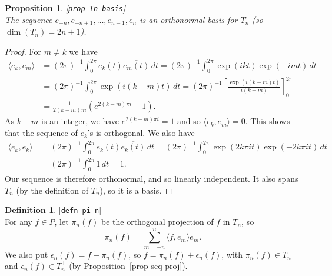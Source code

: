 \documentclass{amsart}
\newcommand{\lbl}[1]{\label{#1}\textup{[\texttt{#1}]}\ \\}
\newcommand{\lbl}{\label}
\newcommand{\ep}        {\epsilon}
\newcommand{\ip}[1]     {\langle #1\rangle}
\newcommand{\ov}[1]     {\overline{#1}}
\renewcommand{\:}       {\colon}
\newtheorem{proposition}[theorem]{Proposition}
\theoremstyle{definition}
\newtheorem{definition}[theorem]{Definition}
\begin{document}
\begin{proposition}\lbl{prop-Tn-basis}
 The sequence $e_{-n},e_{-n+1},\dotsc,e_{n-1},e_n$ is an
 orthonormal basis for $T_n$ (so $\dim(T_n)=2n+1$).
\end{proposition}
\begin{proof}
 For $m\neq k$ we have
 \begin{align*}
  \ip{e_k,e_m}
   &= (2\pi)^{-1} \int_0^{2\pi} e_k(t) \ov{e_m(t)} \, dt 
    = (2\pi)^{-1} \int_0^{2\pi} \exp(ikt) \exp(-imt) \, dt \\
   &= (2\pi)^{-1} \int_0^{2\pi} \exp(i(k-m)t) \, dt 
    = (2\pi)^{-1} \left[\frac{\exp(i(k-m)t)}{i(k-m)}\right]_0^{2\pi} \\
   &= \frac{1}{2(k-m)\pi i}\left( e^{2(k-m)\pi i} - 1 \right).
 \end{align*}
 As $k-m$ is an integer, we have $e^{2(k-m)\pi i}=1$ and
 so $\ip{e_k,e_m}=0$.  This shows that the sequence of
 $e_k$'s is orthogonal.  We also have 
 \begin{align*}
  \ip{e_k,e_k} 
   &= (2\pi)^{-1}\int_0^{2\pi} e_k(t) \ov{e_k(t)} \, dt 
    = (2\pi)^{-1}\int_0^{2\pi} \exp(2k\pi it) \exp(-2k\pi it) \, dt \\
   &= (2\pi)^{-1}\int_0^{2\pi} 1 \, dt = 1.
 \end{align*}
 Our sequence is therefore orthonormal, and so linearly
 independent.  It also spans $T_n$ (by the definition of
 $T_n$), so it is a basis.
\end{proof}

\begin{definition}\lbl{defn-pi-n}
 For any $f\in P$, let $\pi_n(f)$ be the orthogonal
 projection of $f$ in $T_n$, so 
 \[ \pi_n(f) = \sum_{m=-n}^n \ip{f,e_m} e_m. \] 
 We also put $\ep_n(f)=f-\pi_n(f)$, so
 $f=\pi_n(f)+\ep_n(f)$, with $\pi_n(f)\in T_n$ and
 $\ep_n(f)\in T_n^\perp$ (by
 Proposition~\ref{prop-seq-proj}). 
\end{definition}
\end{document}
